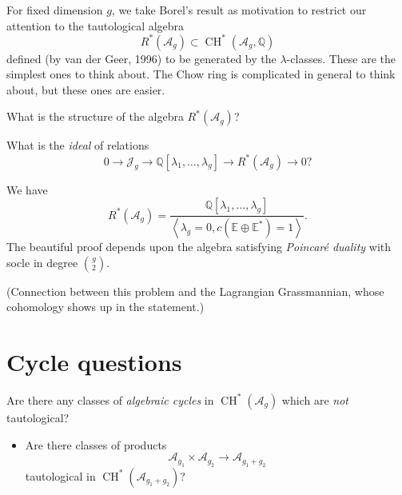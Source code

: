 \documentclass[reqno]{amsart} 
\begin{document}
For fixed dimension $g$, we take Borel's result as motivation to restrict our attention to the tautological algebra
\begin{equation*}
  R^\ast(\mathcal{A}_g) \subset \operatorname{CH}^\ast(\mathcal{A}_g, \mathbb{Q})
\end{equation*}
defined (by van der Geer, 1996) to be generated by the $\lambda$-classes.  These are the simplest ones to think about.  The Chow ring is complicated in general to think about, but these ones are easier.

\begin{question}
  What is the structure of the algebra $R^\ast(\mathcal{A}_g)$?
\end{question}
\begin{question}
  What is the \emph{ideal} of relations
  \begin{equation*}
    0 \rightarrow \mathcal{J}_g \rightarrow \mathbb{Q}[\lambda_1, \dotsc, \lambda_g]
    \rightarrow R^\ast(\mathcal{A}_g) \rightarrow 0?
  \end{equation*}
\end{question}
\begin{theorem}
  We have
  \begin{equation*}
    R^\ast(\mathcal{A}_g) =
    \frac{\mathbb{Q}[\lambda_1, \dotsc, \lambda_g]}{\left\langle \lambda_g = 0,
        c(\mathbb{E} \oplus \mathbb{E}^\ast) = 1\right\rangle}.
  \end{equation*}
  The beautiful proof depends upon the algebra satisfying \emph{Poincar{\'e} duality} with socle in degree $\binom{g}{2}$.
\end{theorem}
(Connection between this problem and the Lagrangian Grassmannian, whose cohomology shows up in the statement.)

\section{Cycle questions}

\begin{question}
  Are there any classes of \emph{algebraic cycles} in $\operatorname{CH}^\ast(\mathcal{A}_g)$ which are \emph{not} tautological?
\end{question}
\begin{itemize}
\item Are there classes of products
  \begin{equation*}
    \mathcal{A}_{g_1} \times \mathcal{A}_{g_2} \rightarrow \mathcal{A}_{g_1 + g_2}
  \end{equation*}
  tautological in $\operatorname{CH}^\ast(\mathcal{A}_{g_1 + g_2})$?
\end{itemize}
\end{document}
